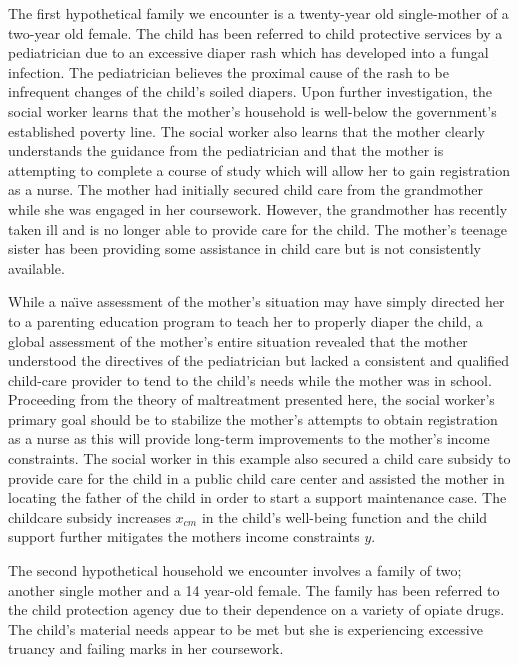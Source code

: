 \documentclass[1p, review]{elsarticle}\usepackage[]{graphicx}\usepackage[]{color}
\begin{document}
The first hypothetical family we encounter is a twenty-year old single-mother of a two-year old female. The child has been referred to child protective services by a pediatrician due to an excessive diaper rash which has developed into a fungal infection. The pediatrician believes the proximal cause of the rash to be infrequent changes of the child's soiled diapers. Upon further investigation, the social worker learns that the mother's household is well-below the government's established poverty line. The social worker also learns that the mother clearly understands the guidance from the pediatrician and that the mother is attempting to complete a course of study which will allow her to gain registration as a nurse. The mother had initially secured child care from the grandmother while she was engaged in her coursework. However, the grandmother has recently taken ill and is no longer able to provide care for the child. The mother's teenage sister has been providing some assistance in child care but is not consistently available. 

While a na\"\i ve assessment of the mother's situation may have simply directed her to a parenting education program to teach her to properly diaper the child, a global assessment of the mother's entire situation revealed that the mother understood the directives of the pediatrician but lacked a consistent and qualified child-care provider to tend to the child's needs while the mother was in school. Proceeding from the theory of maltreatment presented here, the social worker's primary goal should be to stabilize the mother's attempts to obtain registration as a nurse as this will provide long-term improvements to the mother's income constraints. The social worker in this example also secured a child care subsidy to provide care for the child in a public child care center and assisted the mother in locating the father of the child in order to start a support maintenance case. The childcare subsidy increases $x_{cm}$ in the child's well-being function and the child support further mitigates the mothers income constraints $y$. 

The second hypothetical household we encounter involves a family of two; another single mother and a 14 year-old female. The family has been referred to the child protection agency due to their dependence on a variety of opiate drugs. The child's material needs appear to be met but she is experiencing excessive truancy and failing marks in her coursework. 
\end{document}
